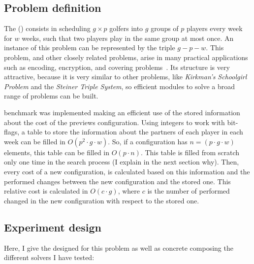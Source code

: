
\subsection{Problem definition}

The \sgp{} (\SGP) consists in scheduling $g\times p$ golfers into $g$ groups of $p$ players every week for $w$ weeks, such that two players play in the same group at most once. An instance of this problem can be represented by the triple $g-p-w$. This problem, and other closely related problems, arise in many practical applications such as encoding, encryption, and covering problems~\cite{Lardeux2014}. Its structure is very attractive, because it is very similar to other problems, like \textit{Kirkman's Schoolgirl Problem} and the \textit{Steiner Triple System}, so efficient modules to solve a broad range of problems can be built.

 benchmark was implemented making an efficient use of the stored information about the cost of the previews configuration. Using integers to work with bit-flags, a table to store the information about the partners of each player in each week can be filled in $O\left(p^2\cdot g \cdot w\right)$. So, if a configuration has $n = (p\cdot g \cdot w)$ elements, this table can be filled in $O\left(p\cdot n\right)$. This table is filled from scratch only one time in the search process (I explain in the next section why). Then, every cost of a new configuration, is calculated based on this information and the performed changes between the new configuration and the stored one. This relative cost is calculated in $O\left(c\cdot g\right)$, where $c$ is the number of performed changed in the new configuration with respect to the stored one.

\subsection{Experiment design}

Here, I give the \as{} designed for this problem as well as concrete \oms{} composing the different solvers I have tested:

